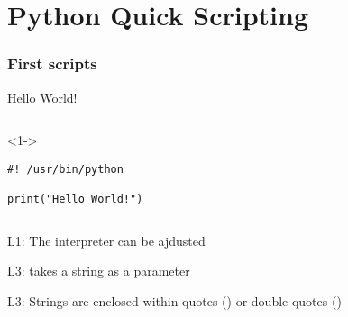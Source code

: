 
\part{Python Quick Scripting}  %


\section{First scripts}


\begin{frame}[fragile]{Hello World!}


  \begin{columns}[onlytextwidth]
    \begin{column}{\textwidth}
      \begin{onlyenv}<1->
        \begin{lstlisting}[style=python]
#! /usr/bin/python

print("Hello World!") \end{lstlisting}
      \end{onlyenv}
    \end{column}
  \end{columns}

   L1: The interpreter can be ajdusted

   L3:  takes a string as a parameter

   L3: Strings are enclosed within quotes (\TTBF{\textquotesingle}) or double quotes (\TTBF{\textquotedbl})

\end{frame}


